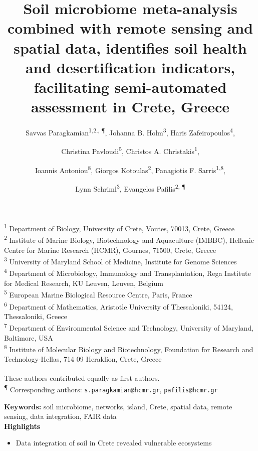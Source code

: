 \documentclass[a4paper,12pt]{article}
\title{
    Soil microbiome meta-analysis combined with remote sensing and spatial data,
    identifies soil health and desertification indicators, facilitating semi-automated assessment in Crete, Greece
}
\author{
    Savvas Paragkamian\textsuperscript{1,2,\dag, \P},
    Johanna B. Holm\textsuperscript{3\dag},
    Haris Zafeiropoulos\textsuperscript{4}, \and
    Christina Pavloudi\textsuperscript{5},
    Christos A. Christakis\textsuperscript{1}, \and
    Ioannis Antoniou\textsuperscript{8},
    Giorgos Kotoulas\textsuperscript{2},
    Panagiotis F. Sarris\textsuperscript{1,8}, \and
    Lynn Schriml\textsuperscript{3},
    Evangelos Pafilis\textsuperscript{2, \P}
}
\begin{document}
\maketitle

\begin{center}
\textsuperscript{1} Department of Biology, University of Crete, Voutes, 70013, Crete, Greece \\
\textsuperscript{2} Institute of Marine Biology, Biotechnology and Aquaculture (IMBBC), Hellenic Centre for Marine Research (HCMR), Gournes, 71500, Crete, Greece \\
\textsuperscript{3} University of Maryland School of Medicine, Institute for Genome Sciences \\
\textsuperscript{4} Department of Microbiology, Immunology and Transplantation, Rega Institute for Medical Research, KU Leuven, Leuven, Belgium \\
\textsuperscript{5} European Marine Biological Resource Centre, Paris, France \\
\textsuperscript{6} Department of Mathematics, Aristotle University of Thessaloniki, 54124, Thessaloniki, Greece \\
\textsuperscript{7} Department of Environmental Science and Technology, University of Maryland, Baltimore, USA \\
\textsuperscript{8} Institute of Molecular Biology and Biotechnology, Foundation for Research and Technology-Hellas, 714 09 Heraklion, Crete, Greece
\end{center}
\vspace{1em}

\noindent\textsuperscript{\dag} These authors contributed equally as first authors. \\
\noindent\textsuperscript{\P} Corresponding authors: \texttt{s.paragkamian@hcmr.gr}, \texttt{pafilis@hcmr.gr}

\begin{abstract}


\end{abstract}

\noindent\textbf{Keywords:} soil microbiome, networks, island, Crete, spatial data, remote sensing, data integration, FAIR data\\

\noindent\textbf{Highlights}

\begin{itemize}
    \item Data integration of soil in Crete revealed vulnerable ecosystems
\end{itemize}
\end{document}
